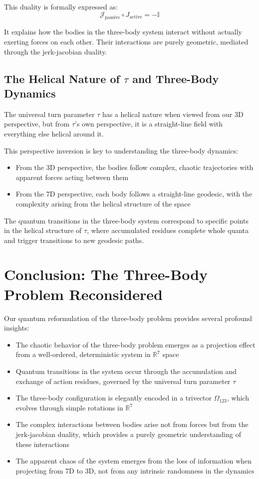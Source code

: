\documentclass{article}
\begin{document}
This duality is formally expressed as:
\begin{equation}
\mathcal{J}_{\text{passive}} \circ J_{\text{active}} = -\mathbb{I}
\end{equation}

It explains how the bodies in the three-body system interact without actually exerting forces on each other. Their interactions are purely geometric, mediated through the jerk-jacobian duality.

\subsection{The Helical Nature of $\tau$ and Three-Body Dynamics}

The universal turn parameter $\tau$ has a helical nature when viewed from our 3D perspective, but from $\tau$'s own perspective, it is a straight-line field with everything else helical around it.

This perspective inversion is key to understanding the three-body dynamics:
\begin{itemize}
\item From the 3D perspective, the bodies follow complex, chaotic trajectories with apparent forces acting between them
\item From the 7D perspective, each body follows a straight-line geodesic, with the complexity arising from the helical structure of the space
\end{itemize}

The quantum transitions in the three-body system correspond to specific points in the helical structure of $\tau$, where accumulated residues complete whole quanta and trigger transitions to new geodesic paths.

\section{Conclusion: The Three-Body Problem Reconsidered}

Our quantum reformulation of the three-body problem provides several profound insights:

\begin{itemize}
\item The chaotic behavior of the three-body problem emerges as a projection effect from a well-ordered, deterministic system in $\mathbb{R}^7$ space
\item Quantum transitions in the system occur through the accumulation and exchange of action residues, governed by the universal turn parameter $\tau$
\item The three-body configuration is elegantly encoded in a trivector $\Omega_{123}$, which evolves through simple rotations in $\mathbb{R}^7$
\item The complex interactions between bodies arise not from forces but from the jerk-jacobian duality, which provides a purely geometric understanding of these interactions
\item The apparent chaos of the system emerges from the loss of information when projecting from 7D to 3D, not from any intrinsic randomness in the dynamics
\end{itemize}
\end{document}
